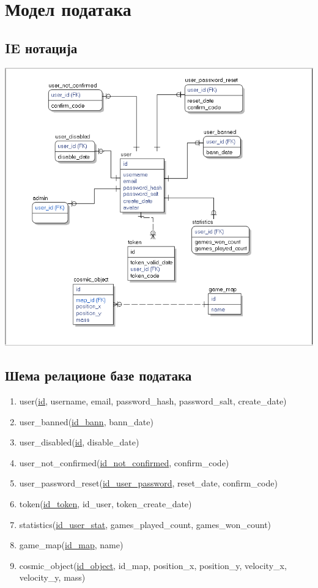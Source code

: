 \section{Модел података}

\subsection{IE нотација}

\includegraphics[width=\textwidth]{../resources/database-model.png}

\subsection{Шема релационе базе података}

\begin{enumerate}
    \item user(\underline{id}, username, email, password\_hash, password\_salt,
        create\_date)
    \item user\_banned(\underline{id\_bann}, bann\_date)
    \item user\_disabled(\underline{id}, disable\_date)
    \item user\_not\_confirmed(\underline{id\_not\_confirmed}, confirm\_code)
    \item user\_password\_reset(\underline{id\_user\_password}, reset\_date, confirm\_code)
    \item token(\underline{id\_token}, id\_user, token\_create\_date)
    \item statistics(\underline{id\_user\_stat}, games\_played\_count, games\_won\_count)
    \item game\_map(\underline{id\_map}, name)
    \item cosmic\_object(\underline{id\_object}, id\_map, position\_x, position\_y,
        velocity\_x, velocity\_y, mass)
\end{enumerate}




